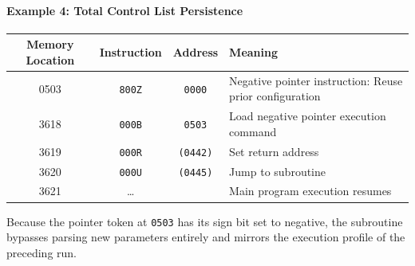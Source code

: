 \paragraph{Example 4: Total Control List Persistence}
\begin{table}[h!]
\centering
\begin{tabularx}{\textwidth}{cccX}
\toprule
\textbf{Memory Location} & \textbf{Instruction} & \textbf{Address} & \textbf{Meaning} \\
\midrule
    0503              & \texttt{800Z}   & \texttt{0000}    & Negative pointer instruction: Reuse prior configuration \\
    3618              & \texttt{000B}   & \texttt{0503}    & Load negative pointer execution command \\
    3619              & \texttt{000R}   & \texttt{(0442)}  & Set return address \\
    3620              & \texttt{000U}   & \texttt{(0445)}  & Jump to subroutine \\
3621              & \dots           &                  & Main program execution resumes \\
\bottomrule
\end{tabularx}
\end{table}
Because the pointer token at \texttt{0503} has its sign bit set to negative, the subroutine bypasses parsing new parameters entirely and mirrors the execution profile of the preceding run.


